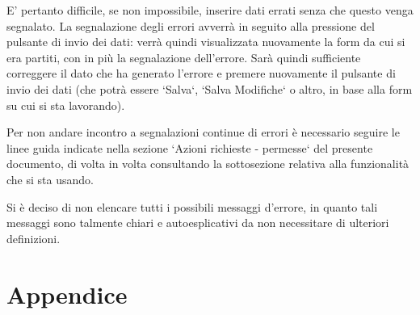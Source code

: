 \documentclass[11pt,a4paper]{article}
\begin{document}
E' pertanto difficile, se non impossibile, inserire dati errati senza che questo venga segnalato.
La segnalazione degli errori avverrà in seguito alla pressione del pulsante di invio dei dati: verrà quindi visualizzata nuovamente la form da cui si era partiti, con in più la segnalazione dell'errore. Sarà quindi sufficiente correggere il dato che ha generato l'errore e premere nuovamente il pulsante di invio dei dati (che potrà essere `Salva`, `Salva Modifiche` o altro, in base alla form su cui si sta lavorando).

Per non andare incontro a segnalazioni continue di errori è necessario seguire le linee guida indicate nella sezione `Azioni richieste - permesse` del presente documento, di volta in volta consultando la sottosezione relativa alla funzionalità che si sta usando.

Si è deciso di non elencare tutti i possibili messaggi d'errore, in quanto tali messaggi sono talmente chiari e autoesplicativi da non necessitare di ulteriori definizioni.
\newpage
\section{Appendice}
\end{document}
